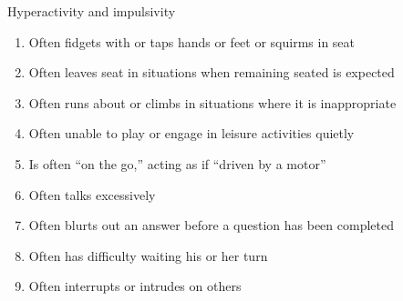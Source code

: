 \documentclass{beamer}
\begin{document}
\begin{frame}{Hyperactivity and impulsivity}
\begin{enumerate}
    \item Often fidgets with or taps hands or feet or squirms in seat
    \item Often leaves seat in situations when remaining seated is expected
    \item Often runs about or climbs in situations where it is inappropriate
    \item Often unable to play or engage in leisure activities quietly
    \item Is often ``on the go,'' acting as if ``driven by a motor''
    \item Often talks excessively
    \item Often blurts out an answer before a question has been completed
    \item Often has difficulty waiting his or her turn
    \item Often interrupts or intrudes on others
\end{enumerate}
\end{frame}
\end{document}
